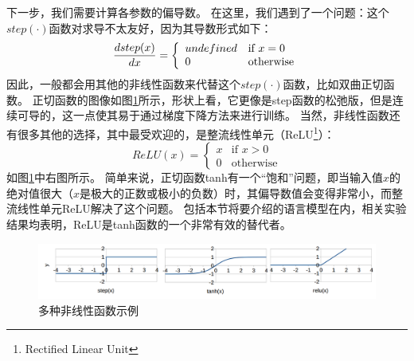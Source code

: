 \documentclass[10pt,a4paper]{ctexart}
\begin{document}
下一步，我们需要计算各参数的偏导数。
在这里，我们遇到了一个问题：这个$step(\cdot)$函数对求导不太友好，因为其导数形式如下：
\begin{equation}\label{eq:37}
 \frac{\mathnormal{d}step(x)}{\mathnormal{d}x} = \left\{ \begin{array}{ll}
  undefined & \textrm{if $x = 0$} \\
  0 & \textrm{otherwise}
  \end{array} \right. 
\end{equation}
因此，一般都会用其他的非线性函数来代替这个$step(\cdot)$函数，比如双曲正切函数。
正切函数的图像如图\ref{fig:9}所示，形状上看，它更像是step函数的松弛版，但是连续可导的，这一点使其易于通过梯度下降方法来进行训练。
当然，非线性函数还有很多其他的选择，其中最受欢迎的，是整流线性单元（ReLU\footnote{Rectified Linear Unit}）：
\begin{equation}\label{eq:38}
 ReLU(x) = \left\{ \begin{array}{ll}
  x & \textrm{if $x > 0$} \\
  0 & \textrm{otherwise}
  \end{array} \right.
\end{equation}
如图\ref{fig:9}中右图所示。
简单来说，正切函数tanh有一个“饱和”问题，即当输入值$x$的绝对值很大（$x$是极大的正数或极小的负数）时，其偏导数值会变得非常小，而整流线性单元ReLU解决了这个问题。
包括本节将要介绍的语言模型在内，相关实验结果均表明，ReLU是tanh函数的一个非常有效的替代者\cite{vaswani2013decoding}。

\begin{figure}[H]
\centering
\includegraphics[width=1\textwidth]{fig9.png}
\caption{多种非线性函数示例}
\label{fig:9}
\end{figure}
\end{document}
